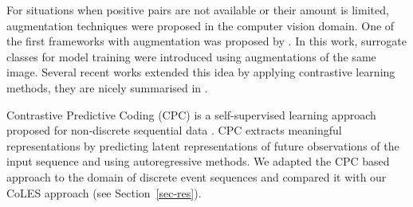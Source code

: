 \documentclass[sigconf, anonymous]{acmart}
\begin{document}
For situations when positive pairs are not available or their amount is limited, augmentation techniques were proposed in the computer vision domain. One of the first frameworks with augmentation  was proposed by \cite{Dosovitskiy2014DiscriminativeUF}. In this work, surrogate classes for model training were introduced using augmentations of the same image. Several recent works \citep{Bachman2019LearningRB, He2019MomentumCF, Chen2020ASF} extended this idea by applying contrastive learning methods, they are nicely summarised in \cite{Falcon2020AFF}.

Contrastive Predictive Coding (CPC) is a self-supervised learning approach proposed for non-discrete sequential data \citep{Oord2018RepresentationLW}. CPC extracts meaningful representations by predicting latent representations of future observations of the input sequence and using autoregressive methods.
We adapted the CPC based approach to the domain of discrete event sequences and compared it with our CoLES approach (see Section~\ref{sec-res}).


\end{document}
